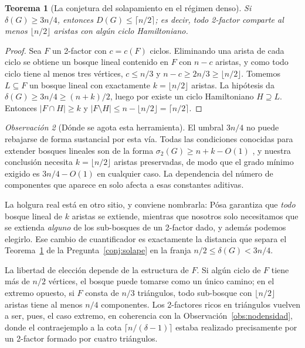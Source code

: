 \documentclass[11pt,a4paper]{article}
\newtheorem{teorema}{Teorema}[section]
\theoremstyle{definition}
\theoremstyle{remark}
\newtheorem{observacion}[teorema]{Observación}
\begin{document}
\begin{teorema}[La conjetura del solapamiento en el régimen denso]\label{thm:denso}
Si $\delta(G)\ge 3n/4$, entonces $D(G)\le\lceil n/2\rceil$; es decir, todo 2-factor comparte al menos $\lfloor n/2\rfloor$ aristas con algún ciclo Hamiltoniano.
\end{teorema}

\begin{proof}
Sea $F$ un 2-factor con $c=c(F)$ ciclos. Eliminando una arista de cada ciclo se obtiene un bosque lineal contenido en $F$ con $n-c$ aristas, y como todo ciclo tiene al menos tres vértices, $c\le n/3$ y $n-c\ge 2n/3\ge\lfloor n/2\rfloor$. Tomemos $L\subseteq F$ un bosque lineal con exactamente $k=\lfloor n/2\rfloor$ aristas. La hipótesis da $\delta(G)\ge 3n/4\ge(n+k)/2$, luego por \cite{posa64,fgj09} existe un ciclo Hamiltoniano $H\supseteq L$. Entonces $|F\cap H|\ge k$ y $|F\setminus H|\le n-\lfloor n/2\rfloor=\lceil n/2\rceil$.
\end{proof}


\begin{observacion}[Dónde se agota esta herramienta]\label{obs:limite34}
El umbral $3n/4$ no puede rebajarse de forma sustancial por esta vía. Todas las condiciones conocidas para extender bosques lineales son de la forma $\sigma_2(G)\ge n+k-O(1)$ \cite{posa64,fgj09,cfgjlp04}, y nuestra conclusión necesita $k=\lfloor n/2\rfloor$ aristas preservadas, de modo que el grado mínimo exigido es $3n/4-O(1)$ en cualquier caso. La dependencia del número de componentes que aparece en \cite{cfgjlp04} solo afecta a esas constantes aditivas.

La holgura real está en otro sitio, y conviene nombrarla: Pósa garantiza que \emph{todo} bosque lineal de $k$ aristas se extiende, mientras que nosotros solo necesitamos que se extienda \emph{alguno} de los sub-bosques de un 2-factor dado, y además podemos elegirlo. Ese cambio de cuantificador es exactamente la distancia que separa el Teorema~\ref{thm:denso} de la Pregunta~\ref{conj:solape} en la franja $n/2\le\delta(G)<3n/4$.

La libertad de elección depende de la estructura de $F$. Si algún ciclo de $F$ tiene más de $n/2$ vértices, el bosque puede tomarse como un único camino; en el extremo opuesto, si $F$ consta de $n/3$ triángulos, todo sub-bosque con $\lfloor n/2\rfloor$ aristas tiene al menos $n/4$ componentes. Los 2-factores ricos en triángulos vuelven a ser, pues, el caso extremo, en coherencia con la Observación~\ref{obs:nodensidad}, donde el contraejemplo a la cota $\lceil n/(\delta-1)\rceil$ estaba realizado precisamente por un 2-factor formado por cuatro triángulos.
\end{observacion}
\end{document}
